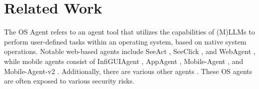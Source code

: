 \section{Related Work}
The OS Agent refers to an agent tool that utilizes the capabilities of (M)LLMs to perform user-defined tasks within an operating system, based on native system operations. Notable web-based agents include SeeAct \citep{zheng2024gpt4visiongeneralistwebagent}, SeeClick \citep{cheng2024seeclickharnessingguigrounding}, and WebAgent \citep{gur2024realworldwebagentplanninglong}, while mobile agents consist of InfiGUIAgent \citep{liu2025infiguiagent}, AppAgent \citep{zhang2023appagentmultimodalagentssmartphone}, Mobile-Agent \citep{wang2024mobileagentautonomousmultimodalmobile}, and Mobile-Agent-v2 \citep{wang2024mobileagentv2mobiledeviceoperation}. Additionally, there are various other agents \citep{yan2023gpt4vwonderlandlargemultimodal,li2023zeroshotlanguageagentcomputer,wu2024oscopilotgeneralistcomputeragents,tan2024cradleempoweringfoundationagents,lee2024exploreselectderiverecall,hoscilowicz2024clickagentenhancinguilocation,deng2024multiturninstructionfollowingconversational,hu2024infiagent}. These OS agents are often exposed to various security risks.

